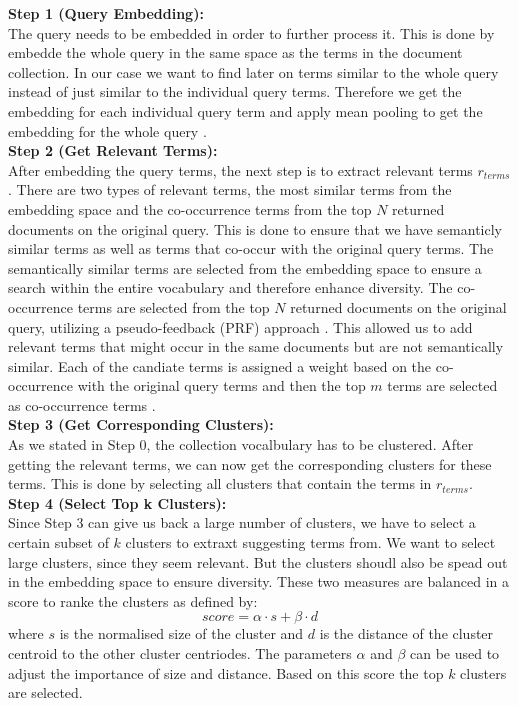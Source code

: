 \textbf{Step 1 (Query Embedding):}\\
The query needs to be embedded in order to further process it. This is done by embedde the whole query in the same space as the terms in the document collection. In our case we want to find later on terms similar to the whole query instead of just similar to the individual query terms. Therefore we get the embedding for each individual query term and apply mean pooling to get the embedding for the whole query \cite{chen2018enhancing}.\\

\textbf{Step 2 (Get Relevant Terms):}\\
After embedding the query terms, the next step is to extract relevant terms $r_{terms}$. There are two types of relevant terms, the most similar terms from the embedding space and the co-occurrence terms from the top $N$ returned documents on the original query. This is done to ensure that we have semanticly similar terms as well as terms that co-occur with the original query terms.
The semantically similar terms are selected from the embedding space to ensure a search within the entire vocabulary and therefore enhance diversity.
The co-occurrence terms are selected from the top $N$ returned documents on the original query, utilizing a pseudo-feedback (PRF) approach \cite{azad2019query}. This allowed us to add relevant terms that might occur in the same documents but are not semantically similar.
Each of the candiate terms is assigned a weight based on the co-occurrence with the original query terms and then the top $m$ terms are selected as co-occurrence terms \cite{azad2019query}.\\

\textbf{Step 3 (Get Corresponding Clusters):}\\
As we stated in Step 0, the collection vocalbulary has to be clustered. After getting the relevant terms, we can now get the corresponding clusters for these terms. This is done by selecting all clusters that contain the terms in $r_{terms}$.\\

\textbf{Step 4 (Select Top k Clusters):}\\
Since Step 3 can give us back a large number of clusters, we have to select a certain subset of $k$ clusters to extraxt suggesting terms from. We want to select large clusters, since they seem relevant. But the clusters shoudl also be spead out in the embedding space to ensure diversity. 
These two measures are balanced in a score to ranke the clusters as defined by: $$score = \alpha \cdot s + \beta \cdot d$$
where $s$ is the normalised size of the cluster and $d$ is the distance of the cluster centroid to the other cluster centriodes. The parameters $\alpha$ and $\beta$ can be used to adjust the importance of size and distance. Based on this score the top $k$ clusters are selected.\\

